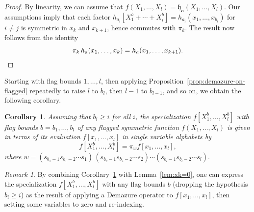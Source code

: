 \documentclass[12pt]{amsart}
\newtheorem{cor}[thm]{Corollary}
\theoremstyle{definition}
\theoremstyle{remark}
\newtheorem{remark}[thm]{Remark}
\newcommand{\aA}{{\mathbf a}}
\newcommand{\fh}{{\mathfrak h}}
\newcommand{\Dem}{\pi }
\begin{document}
\begin{proof}
By linearity, we can assume that $f(X_{1},\ldots,X_{l}) = \fh_{\aA
}(X_{1},\ldots,X_{l})$.  Our assumptions imply that each factor
$h_{a_{i}}[X^b_{1}+\cdots +X^b_{i}] = h_{a_{i}}(x_{1}, \ldots,x_{b_{i}})$
for $i\not =j$ is symmetric in $x_{k}$ and $x_{k+1}$, hence commutes
with $\Dem _{k}$.  The result now follows from the identity
\begin{equation}\label{e:demazure-on-h}
\Dem _{k}\, h_{a}(x_{1},\ldots,x_{k}) = h_{a}(x_{1},\ldots,x_{k+1}).
\qedhere
\end{equation}
\end{proof}

Starting with flag bounds $1,\ldots,l$, then applying
Proposition~\ref{prop:demazure-on-flagged} repeatedly to raise $l$ to
$b_{l}$, then $l-1$ to $b_{l-1}$, and so on, we obtain the following
corollary.

\begin{cor}\label{cor:demazure-on-flagged}
Assuming that $b_{i}\geq i$ for all $i$, the specialization
$f[X^b_{1},\ldots,X^b_{l}]$ with flag bounds $b = b_{1},\ldots,b_{l}$ of any
flagged symmetric function $f(X_{1},\ldots,X_{l})$ is given in terms
of its evaluation $f[x_{1},\ldots,x_{l}]$ in single variable alphabets
by
\begin{equation}\label{e:demazure-on-single}
f[X^b_{1},\ldots,X^b_{l}] = \Dem _{w} f[x_{1},\ldots,x_{l}],
\end{equation}
where $w =(s_{b_{1}-1} s_{b_{1}-2}\cdots s_{1})\, (s_{b_{2}-1}
s_{b_{2}-2}\cdots s_{2})\cdots (s_{b_{l}-1} s_{b_{l}-2}\cdots s_{l}).$
\end{cor}

\begin{remark}\label{rem:demazure-on-flagged}
By combining Corollary~\ref{cor:demazure-on-flagged} with
Lemma~\ref{lem:xk=0}, one can express the specialization
$f[X^b_{1},\ldots,X^b_{l}]$ with any flag bounds $b$ (dropping the
hypothesis $b_{i}\geq i$) as the result of applying a Demazure
operator to $f[x_{1},\ldots,x_{l}]$, then setting some variables to
zero and re-indexing.
\end{remark}
\end{document}

